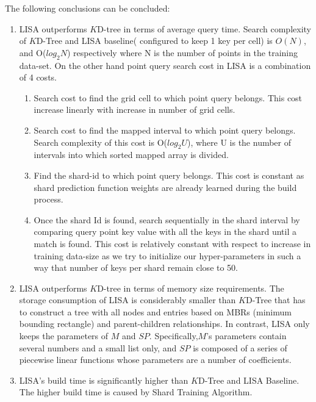 \begin{mscconclusion}
The following conclusions can be concluded:

	\begin{enumerate}
    \item LISA outperforms $K$D-tree in terms of average query time. Search complexity of $K$D-Tree and LISA baseline( configured to keep 1 key per cell) is $O(N)$, and O($log_{2}N$) respectively where N is the number of points in the training data-set. On the other hand point query search cost in LISA is a combination of 4 costs.
    \begin{enumerate}
    \item Search cost to find the grid cell to which point query belongs. This cost increase linearly with increase in number of grid cells. 
    \item Search cost to find the mapped interval to which point query belongs. Search complexity of this cost is O($log_{2}U$), where U is the number of intervals into which sorted mapped array is divided. 
    
    \item Find the shard-id to which point query belongs. This cost is constant as shard prediction function weights are already learned during the build process. 
    
    \item Once the shard Id is found, search sequentially in the shard interval by comparing query point key value with all the keys in the shard until a match is found. This cost is relatively constant with respect to increase in training data-size as we try to initialize our hyper-parameters in such a way that number of keys per shard remain close to 50. 
\end{enumerate}
    
    \item LISA outperforms $K$D-tree in terms of memory size requirements. The storage consumption of LISA is considerably smaller than $K$D-Tree that has to construct a tree with all nodes and entries based on MBRs (minimum bounding rectangle)  and parent-children relationships. In contrast, LISA only keeps the parameters of $M$ and $SP$. Specifically,$M$’s parameters contain several numbers and a small list only, and $SP$ is composed of a series of piecewise linear functions whose parameters are a number of coefficients.
    
    \item LISA's build time is significantly higher than $K$D-Tree and LISA Baseline. The higher build time is caused by Shard Training Algorithm.  
\end{enumerate}

\end{mscconclusion}

